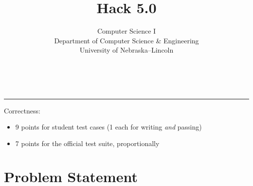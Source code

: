\documentclass[12pt]{scrartcl}
\title{Hack 5.0}\let\Title\@title
\subtitle{Computer Science I\\
{\small
\vskip1cm
Department of Computer Science \& Engineering \\
University of Nebraska--Lincoln}
\vskip-1cm}
\date{~}
\begin{document}
\maketitle

\hrule



Correctness:
\begin{itemize}
  \item 9 points for student test cases (1 each for writing \emph{and} passing)
  \item 7 points for the official test suite, proportionally
\end{itemize}

\section*{Problem Statement}
\end{document}
